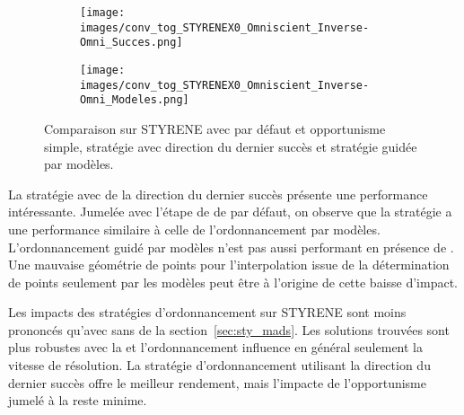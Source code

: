 \begin{figure}[!htb]
	\centering
	\begin{subfigure}{0.43\textwidth}
		\texttt{[image: images/conv\_tog\_STYRENEX0\_Omniscient\_Inverse-Omni\_Succes.png]}
	\end{subfigure}%
	\begin{subfigure}{0.43\textwidth}
		\texttt{[image: images/conv\_tog\_STYRENEX0\_Omniscient\_Inverse-Omni\_Modeles.png]}
	\end{subfigure}
	\caption{Comparaison sur STYRENE avec \MADS par défaut et opportunisme simple, stratégie avec direction du dernier succès et stratégie guidée par modèles.}
	\label{fig:t_styrene_2}
\end{figure}

La stratégie avec de la direction du dernier succès présente une performance intéressante. Jumelée avec l'étape de \SEARCH de \MADS par défaut, on observe que la stratégie a une performance similaire à celle de l'ordonnancement par modèles. L'ordonnancement guidé par modèles n'est pas aussi performant en présence de \SEARCH. Une mauvaise géométrie de points pour l'interpolation issue de la détermination de points seulement par les modèles peut être à l'origine de cette baisse d'impact.

Les impacts des stratégies d'ordonnancement sur STYRENE sont moins prononcés qu'avec \MADS sans \SEARCH de la section~\ref{sec:sty_mads}. Les solutions trouvées sont plus robustes avec la \SEARCH et l'ordonnancement influence en général seulement la vitesse de résolution. La stratégie d'ordonnancement utilisant la direction du dernier succès offre le meilleur rendement, mais l'impacte de l'opportunisme jumelé à la \SEARCH reste minime.